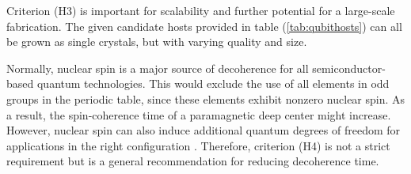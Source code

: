 \begin{table}[!ht]
\centering
\noindent{}
\caption{Table taken from \citeauthor{Gordon2013} \cite{Gordon2013} that lists a number of tetrahedrally coordinated hosts whose band gaps are larger than $2.0$ (eV), and compares it to diamond and Si. All experimental values are from Ref. \cite{Martienssen2005}, except for where explicity cited otherwise. }
\label{tab:qubithosts}
\end{table}

Criterion (H3) is important for scalability and further potential for a large-scale fabrication. The given candidate hosts provided in table (\ref{tab:qubithosts}) can all be grown as single crystals, but with varying quality and size.

\noindent Normally, nuclear spin is a major source of decoherence for all semiconductor-based quantum technologies. This would exclude the use of all elements in odd groups in the periodic table, since these elements exhibit nonzero nuclear spin. As a result, the spin-coherence time of a paramagnetic deep center \cite{Weber2010} might increase. However, nuclear spin can also induce additional quantum degrees of freedom for applications in the right configuration \cite{Bassett2019}. Therefore, criterion (H4) is not a strict requirement but is a general recommendation for reducing decoherence time.  %


